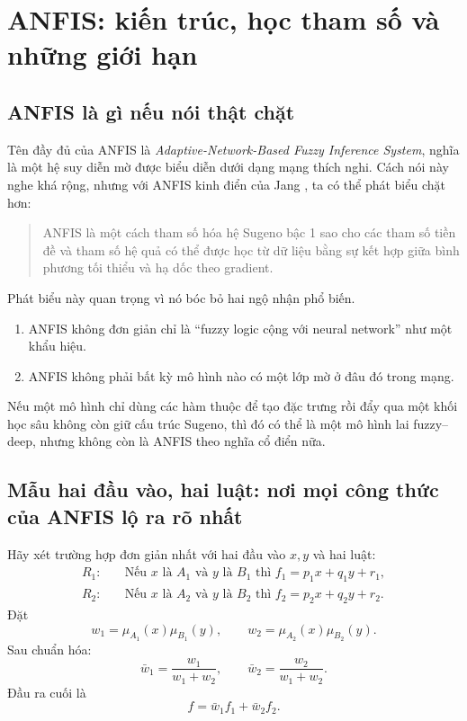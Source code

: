 \chapter{ANFIS: kiến trúc, học tham số và những giới hạn}

\section{ANFIS là gì nếu nói thật chặt}

Tên đầy đủ của ANFIS là \emph{Adaptive-Network-Based Fuzzy Inference System}, nghĩa là một hệ suy diễn mờ được biểu diễn dưới dạng mạng thích nghi. Cách nói này nghe khá rộng, nhưng với ANFIS kinh điển của Jang \citep{jang1993anfis}, ta có thể phát biểu chặt hơn:

\begin{quote}
ANFIS là một cách tham số hóa hệ Sugeno bậc 1 sao cho các tham số tiền đề và tham số hệ quả có thể được học từ dữ liệu bằng sự kết hợp giữa bình phương tối thiểu và hạ dốc theo gradient.
\end{quote}

Phát biểu này quan trọng vì nó bóc bỏ hai ngộ nhận phổ biến.

\begin{enumerate}
\item ANFIS không đơn giản chỉ là ``fuzzy logic cộng với neural network'' như một khẩu hiệu.
\item ANFIS không phải bất kỳ mô hình nào có một lớp mờ ở đâu đó trong mạng.
\end{enumerate}

Nếu một mô hình chỉ dùng các hàm thuộc để tạo đặc trưng rồi đẩy qua một khối học sâu không còn giữ cấu trúc Sugeno, thì đó có thể là một mô hình lai fuzzy--deep, nhưng không còn là ANFIS theo nghĩa cổ điển nữa.

\section{Mẫu hai đầu vào, hai luật: nơi mọi công thức của ANFIS lộ ra rõ nhất}

Hãy xét trường hợp đơn giản nhất với hai đầu vào \(x,y\) và hai luật:
\begin{align*}
R_1:\quad & \text{Nếu } x \text{ là } A_1 \text{ và } y \text{ là } B_1
\text{ thì } f_1=p_1x+q_1y+r_1,\\
R_2:\quad & \text{Nếu } x \text{ là } A_2 \text{ và } y \text{ là } B_2
\text{ thì } f_2=p_2x+q_2y+r_2.
\end{align*}
Đặt
\[
w_1=\mu_{A_1}(x)\mu_{B_1}(y),
\qquad
w_2=\mu_{A_2}(x)\mu_{B_2}(y).
\]
Sau chuẩn hóa:
\[
\bar{w}_1=\frac{w_1}{w_1+w_2},
\qquad
\bar{w}_2=\frac{w_2}{w_1+w_2}.
\]
Đầu ra cuối là
\[
f=\bar{w}_1 f_1+\bar{w}_2 f_2.
\]

